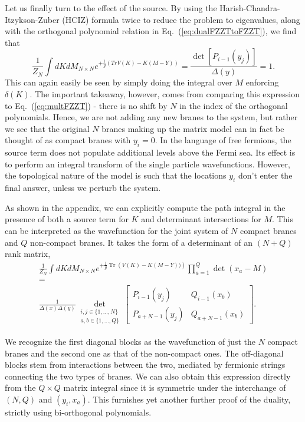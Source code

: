 \documentclass[english]{article}
\DeclareMathOperator{\Tr}{Tr}
\begin{document}
Let us finally turn to the effect of the source. By using the Harish-Chandra-Itzykson-Zuber (HCIZ) formula \cite{harish1957differential,itzykson1980planar} twice to reduce the problem to eigenvalues, along with the orthogonal polynomial relation in Eq.~(\ref{eq:dualFZZTtoFZZT}), we find that 
\begin{equation} \label{eq:justsource}
    \frac{1}{Z_{N}}\int dK dM_{N \times N} e^{+ \frac{1}{g} \left( Tr V(K) - K(M-Y) \right)} = \frac{\det \left[  P_{i-1}(y_{j})\right]}{\Delta(y)}= 1.
\end{equation}
This can again easily be seen by simply doing the integral over $M$ enforcing $\delta(K)$. The important takeaway, however, comes from comparing this expression to Eq.~(\ref{eq:multFZZT}) - there is no shift by $N$ in the index of the orthogonal polynomials. Hence, we are not adding any new branes to the system, but rather we see that the original $N$ branes making up the matrix model can in fact be thought of as compact branes with $y_i=0$. In the language of free fermions, the source term does not populate additional levels above the Fermi sea. Its effect is to perform an integral transform of the single particle wavefunctions. However, the topological nature of the model is such that the locations $y_i$ don't enter the final answer, unless we perturb the system. 

As shown in the appendix, we can explicitly compute the path integral in the presence of both a source term for $K$ and determinant intersections for $M$. This can be interpreted as the wavefunction for the joint system of $N$ compact branes and $Q$ non-compact branes. It takes the form of a determinant of an $(N+Q)$ rank matrix,
\begin{eqnarray} \label{eq:Zwithboth}
   & \frac{1}{Z_N} \int dK dM_{N\times N} e^{+\frac{1}{g}\Tr \left( V(K)-K(M-Y)) \right)} \prod_{a=1}^{Q}\det(x_{a}-M) & \\ \nonumber
   & = & \\ \nonumber
   & \frac{1}{\Delta(x) \Delta(y)} \underset{\substack{
i,j \in \{1,\dots,N\} \\
a,b \in \{1,\dots,Q \} }}\det \left[ \begin{array}{c|c} 
    P_{i-1}(y_{j}) & Q_{i-1}(x_{b}) \\ \hline
    P_{a+N-1}(y_{j}) & Q_{a+N-1}(x_{b}) 
    \end{array}\right]. & 
\end{eqnarray}

We recognize the first diagonal blocks as the wavefunction of just the $N$ compact branes and the second one as that of the non-compact ones. The off-diagonal blocks stem from interactions between the two, mediated by fermionic strings connecting the two types of branes. We can also obtain this expression directly from the $Q \times Q$ matrix integral since it is symmetric under the interchange of $(N, Q)$ and $(y_i, x_a)$. This furnishes yet another further proof of the duality, strictly using bi-orthogonal polynomials.  
\end{document}
